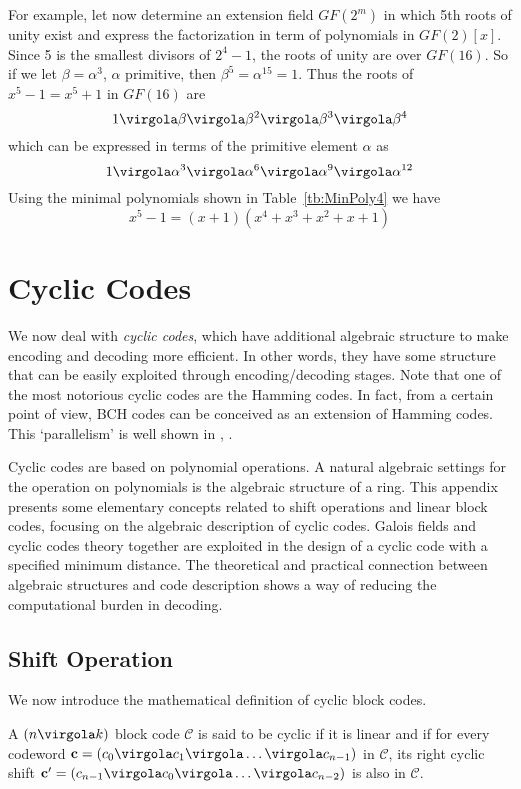 For example, let now determine an extension field \(GF(2^m)\) in which 5th roots of unity exist and express the factorization in term of polynomials in \(GF(2)[x]\). Since 5 is the smallest divisors of \(2^4-1\), the roots of unity are over \(GF(16)\). So if we let \(\beta=\alpha^3\), \(\alpha\) primitive, then \(\beta^5=\alpha^15=1\). Thus the roots of \(x^5-1=x^5+1\) in \(GF(16)\) are
\[
1 \virgola \beta \virgola \beta^2 \virgola \beta^3 \virgola \beta^4
\]
which can be expressed in terms of the primitive element \(\alpha\) as
\[
1 \virgola \alpha^3 \virgola \alpha^6 \virgola \alpha^9 \virgola \alpha^{12}
\]
Using the minimal polynomials shown in Table~\ref{tb:MinPoly4} we have
\[
x^5-1=(x+1)(x^4+x^3+x^2+x+1)
\]

\chapter{Cyclic Codes}

We now deal with \emph{cyclic codes}, which have additional algebraic structure to make encoding and decoding more efficient. In other words, they have some structure that can be easily exploited through encoding/decoding stages. Note that one of the most notorious cyclic codes are the Hamming codes. In fact, from a certain point of view, BCH codes can be conceived as an extension of Hamming codes. This `parallelism' is well shown in \cite{b:wicker}, \cite{b:mcwilliams}.

Cyclic codes are based on polynomial operations. A natural algebraic settings for the operation on polynomials is the algebraic structure of a ring.
This appendix presents some elementary concepts related to shift operations and linear block codes, focusing on the algebraic description of cyclic codes. Galois fields and cyclic codes theory together are exploited in the design of a cyclic code with a specified minimum distance. The theoretical and practical connection between algebraic structures and code description shows a way of reducing the computational burden in decoding.

\section{Shift Operation} \label{sec:shift}
We now introduce the mathematical definition of cyclic block codes.
\begin{Def}
A \( (n \virgola k) \) block code $\mathcal C$ is said to be cyclic if it is linear and if for every codeword \( \vet{c}=(c_0 \virgola c_1 \virgola \ldots \virgola c_{n-1}) \) in $\mathcal C$, its right cyclic shift \( \vet{c'}=(c_{n-1} \virgola c_0 \virgola \ldots \virgola c_{n-2}) \) is also in \( \mathcal C \).
\end{Def}

